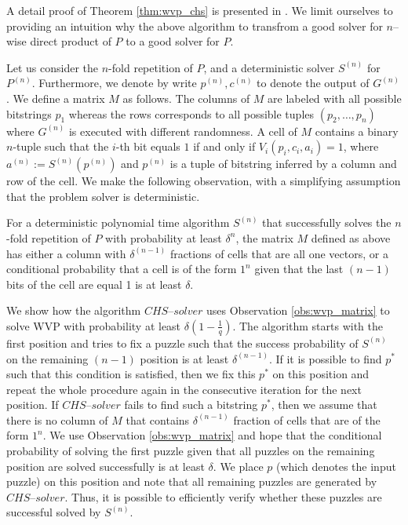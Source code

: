 %
A detail proof of Theorem \ref{thm:wvp_chs} is presented in \cite{canetti2004hardness}.
We limit ourselves to providing an intuition why the above algorithm to transfrom a good solver
for $n$--wise direct product of $P$ to a good solver for $P$.

Let us consider the $n$-fold repetition of $P$, and a deterministic solver $S^{(n)}$ for $P^{(n)}$.
Furthermore, we denote by write $p^{(n)}, c^{(n)}$ to denote the output of $G^{(n)}$.
We define a matrix $M$ as follows. The columns of $M$ are labeled with all possible bitstrings $p_1$
whereas the rows corresponds to all possible tuples $(p_2, \dotsc, p_n)$ where $G^{(n)}$ is executed with different randomness.
A cell of $M$ contains a binary $n$-tuple such that the $i$-th bit equals $1$ if and only if $V_i(p_i, c_i, a_i) = 1$, where
 $a^{(n)} := S^{(n)}(p^{(n)})$ and $p^{(n)}$ is a tuple of bitstring inferred by a column and row of the cell.
We make the following observation, with a simplifying assumption that the problem solver is deterministic.
\begin{observation}
\label{obs:wvp_matrix}
For a deterministic polynomial time algorithm $S^{(n)}$ that successfully solves the $n$-fold repetition of $P$ with probability at least $\delta^{n}$,
the matrix $M$ defined as above has either a column with $\delta^{(n-1)}$ fractions of cells that are all one vectors, or
a conditional probability that a cell is of the form $1^n$ given that the last $(n-1)$ bits of the cell are equal 1 is at least $\delta$.
\end{observation}
%
%
We show how the algorithm $\mathit{CHS\text{--}solver}$ uses Observation \ref{obs:wvp_matrix} to solve WVP with probability at least $\delta(1 - \frac{1}{q})$.
The algorithm starts with the first position and tries to fix a puzzle such that the success probability of $S^{(n)}$ on the remaining $(n-1)$
position is at least $\delta^{(n-1)}$. If it is possible to find $p^*$ such that this condition is satisfied, then we fix this $p^*$
on this position and repeat the whole procedure again in the consecutive iteration for the next position.
If $\mathit{CHS\text{--}solver}$ fails to find such a bitstring $p^*$, then we assume that there is no column of $M$ that contains $\delta^{(n-1)}$ fraction
of cells that are of the form $1^n$. We use Observation \ref{obs:wvp_matrix} and hope that the conditional probability of
solving the first puzzle given that all puzzles on the remaining position are solved successfully is at least $\delta$.
We place $p$ (which denotes the input puzzle) on this position and note that all remaining puzzles are generated by $\mathit{CHS\text{--}solver}$.
Thus, it is possible to efficiently verify whether these puzzles are successful solved by $S^{(n)}$.

